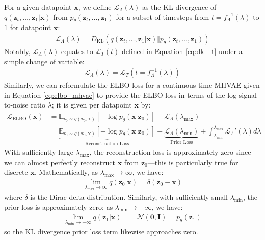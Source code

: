 \documentclass[ oneside,%
                    author={George Herbert},
                    degree={MSci},
                     title={Diffusion Models for Time-Evolving Precipitation Fields},
                  subtitle={}]{dissertation}
\begin{document}
For a given datapoint $\mathbf{x}$, we define $\mathcal{L}_\Lambda(\lambda)$ as the KL divergence of $q(\mathbf{z}_t,\ldots,\mathbf{z}_1|\mathbf{x})$ from $p_\theta(\mathbf{z}_t,\ldots,\mathbf{z}_1)$ for a subset of timesteps from $t=f_\Lambda^{-1}(\lambda)$ to $1$ for datapoint $\mathbf{x}$:
\begin{align}
      \mathcal{L}_\Lambda(\lambda)=D_{\mathrm{KL}}(q(\mathbf{z}_t,\ldots,\mathbf{z}_1|\mathbf{x})\Vert p_\theta(\mathbf{z}_t,\ldots,\mathbf{z}_1))
\end{align}
Notably, $\mathcal{L}_\Lambda(\lambda)$ equates to $\mathcal{L}_T(t)$ defined in Equation \ref{eq:dkl_t} under a simple change of variable:
\begin{align}
      \mathcal{L}_\Lambda(\lambda)=\mathcal{L}_T(t=f_\Lambda^{-1}(\lambda))
\end{align}
Similarly, we can reformulate the ELBO loss for a continuous-time MHVAE given in Equation \ref{eq:elbo_mhvae} to provide the ELBO loss in terms of the log signal-to-noise ratio $\lambda$; it is given per datapoint $\mathbf{x}$ by:
\begin{align}
      \mathcal{L}_{\mathrm{ELBO}}(\mathbf{x})&=\mathbb{E}_{\mathbf{z}_0\sim q(\mathbf{z}_0,\mathbf{x})}\left[-\log p_\theta(\mathbf{x}|\mathbf{z}_0)\right]+\mathcal{L}_\Lambda(\lambda_{\max})\\
      &=\underbrace{\mathbb{E}_{\mathbf{z}_0\sim q(\mathbf{z}_0,\mathbf{x})}\left[-\log p_\theta(\mathbf{x}|\mathbf{z}_0)\right]}_{\text{Reconstruction Loss}}+\underbrace{\mathcal{L}_\Lambda(\lambda_{\min})}_{\text{Prior Loss}}+\int_{\lambda_{\min}}^{\lambda_{\max}}\mathcal{L}_\Lambda'(\lambda)d\lambda\label{eq:diffusion_elbo}
\end{align}
With sufficiently large $\lambda_{\max}$, the reconstruction loss is approximately zero since we can almost perfectly reconstruct $\mathbf{x}$ from $\mathbf{z}_0$---this is particularly true for discrete $\mathbf{x}$. Mathematically, as $\lambda_{\max}\to\infty$, we have:
\begin{align}
      \lim_{\lambda_{\max}\to\infty}q(\mathbf{z}_0|\mathbf{x})=\delta(\mathbf{z}_0-\mathbf{x})
\end{align}
where $\delta$ is the Dirac delta distribution. Similarly, with sufficiently small $\lambda_{\min}$, the prior loss is approximately zero; as $\lambda_{\min}\to-\infty$, we have:
\begin{align}
      \lim_{\lambda_{\min}\to -\infty} q(\mathbf{z}_1|\mathbf{x})&=\mathcal{N}(\mathbf{0}, \mathbf{I})=p_\theta(\mathbf{z}_1)
\end{align}
so the KL divergence prior loss term likewise approaches zero.
\end{document}
